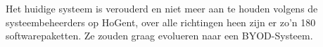 Het huidige systeem is verouderd en niet meer aan te houden volgens de systeembeheerders op HoGent, over alle richtingen heen zijn er zo'n 180 softwarepaketten. Ze zouden graag evolueren naar een BYOD-Systeem.





